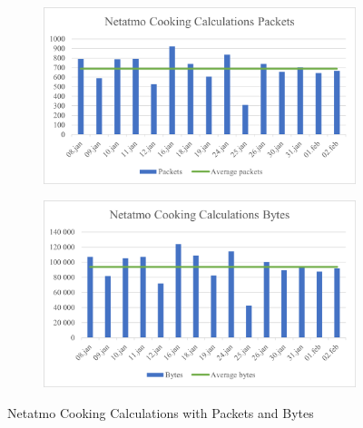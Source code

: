 \begin{figure}[H]
    \centering
    \begin{subfigure}{0.49\textwidth}
       \includegraphics[width=1\hsize]{figures/Netatmo_Cooking_Calculations_Packets.png} 
    \end{subfigure}
    \begin{subfigure}{0.49\textwidth}
        \includegraphics[width=1\hsize]{figures/Netatmo_Cooking_Calculations_Bytes.png} 
    \end{subfigure}
    \caption{Netatmo Cooking Calculations with Packets and Bytes}
    \label{fig:NetatmoCookingCalculations}
\end{figure}

